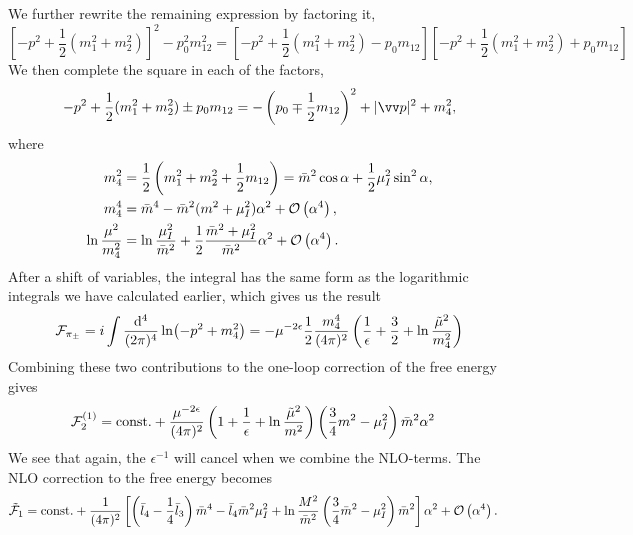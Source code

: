 We further rewrite the remaining expression by factoring it,
\begin{equation}
    \left[-p^2 + \frac{1}{2}(m_1^2 + m_2^2)\right]^2 - p_0^2 m_{12}^2
    = \left[-p^2 + \frac{1}{2}(m_1^2 + m_2^2) - p_0 m_{12} \right]
    \left[-p^2 + \frac{1}{2}(m_1^2 + m_2^2) + p_0 m_{12} \right]
\end{equation}
We then complete the square in each of the factors,
\begin{equation}
    - p^2 + \frac{1}{2}(m_1^2 + m_2^2) \pm p_0 m_{12}
    = - \left(p_0 \mp \frac{1}{2}m_{12}\right)^2 + |\vv p|^2 + m_4^2,
\end{equation}
where
\begin{align}
    m_4^2 &= \frac{1}{2}\left(m_1^2 +m_2^2 +\frac{1}{2}m_{12}\right)
    = \bar m^2 \cos\alpha + \frac{1}{2} \mu_I^2 \sin^2 \alpha, \\
    m_4^4
    &= \bar m^4 - \bar m^2(m^2 + \mu_I^2) \alpha^2 + \Oh[4]{\alpha}, \\
    \ln \frac{\mu^2}{m_4^2} 
    &= \ln \frac{\mu_I^2}{\bar m^2} + \frac{1}{2}\frac{\bar m^2 + \mu_I^2}{\bar m^2}\alpha^2
    + \Oh[4]{\alpha}.
\end{align}
After a shift of variables, the integral has the same form as the logarithmic integrals we have calculated earlier, which gives us the result
\begin{equation}
    \Ef_{\pi_\pm}
    = i \int \frac{\dd^4}{(2\pi)^4}
    \ln(-p^2 + m_4^2)
    = 
    - \mu^{-2\epsilon}\frac{1}{2} \frac{m_4^4}{(4 \pi)^2}
    \left(\frac{1}{\epsilon} + \frac{3}{2} + \ln \frac{\tilde \mu^2}{m_4^2}\right)
\end{equation}
Combining these two contributions to the one-loop correction of the free energy gives
\begin{align*}
    \Ef_2^{(1)}
    &=
    \mathrm{const.}
    +
    \frac{\mu^{-2 \epsilon } }{(4 \pi)^2} 
    \left(1 + \frac{1}{\epsilon} + \ln \frac{\tilde \mu^2}{m^2}\right)
    \left(\frac{3}{4}m^2 - \mu_I^2\right)
    \bar m^2 \alpha^2
\end{align*}
We see that again, the $\epsilon^{-1}$ will cancel when we combine the NLO-terms.
The NLO correction to the free energy becomes
\begin{align}
    \tilde \Ef_1
    & = 
    \const+ 
    \frac{1}{(4\pi)^2}
    \left[
        \left(
            \bar l_4 - \frac{1}{4}\bar l_3
        \right)\bar m^4
        -\bar l_4\bar m^2\mu_I^2
        + \ln\frac{M^2}{\bar m^2}
        \left(\frac{3}{4}\bar m^2 - \mu_I^2\right)\bar m^2
    \right]\alpha^2
    + \Oh[4]{\alpha}.
\end{align}
